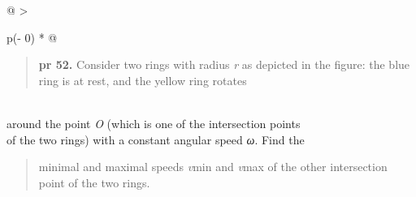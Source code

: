 \documentclass[
]{article}
\begin{document}
\begin{longtable}[]{@{}l@{}}
\toprule
\endhead
 \\
\bottomrule
\end{longtable}

\begin{longtable}[]{@{}
  >{\raggedright\arraybackslash}p{(\columnwidth - 0\tabcolsep) * }@{}}
\toprule
\begin{minipage}[b]{\linewidth}\raggedright
\begin{quote}
\textbf{pr 52.} Consider two rings with radius \emph{r} as depicted in
the ﬁgure: the blue ring is at rest, and the yellow ring rotates
\end{quote}
\end{minipage} \\
\midrule
\endhead
around the point \emph{O} (which is one of the intersection points \\
of the two rings) with a constant angular speed \emph{ω}. Find the \\
\begin{minipage}[t]{\linewidth}\raggedright
\begin{quote}
minimal and maximal speeds \emph{v}min and \emph{v}max of the other
intersection point of the two rings.
\end{quote}
\end{minipage} \\
\bottomrule
\end{longtable}

\begin{longtable}[]{@{}l@{}}
\toprule
\endhead
 \\
\bottomrule
\end{longtable}
\end{document}
